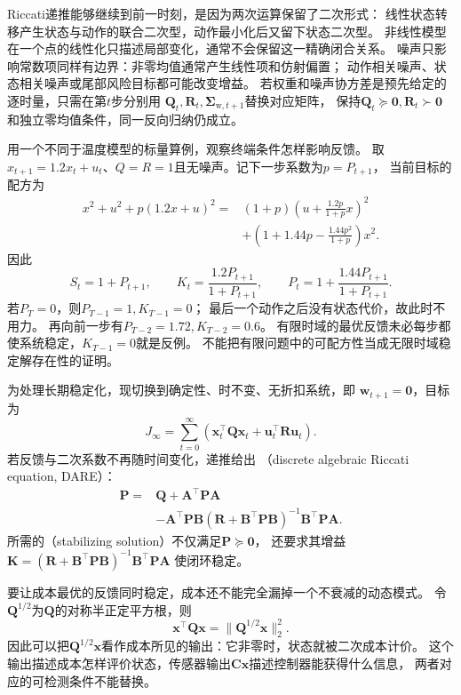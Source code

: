 Riccati递推能够继续到前一时刻，是因为两次运算保留了二次形式：
线性状态转移产生状态与动作的联合二次型，动作最小化后又留下状态二次型。
非线性模型在一个点的线性化只描述局部变化，通常不会保留这一精确闭合关系。
噪声只影响常数项同样有边界：非零均值通常产生线性项和仿射偏置；
动作相关噪声、状态相关噪声或尾部风险目标都可能改变增益。
若权重和噪声协方差是预先给定的逐时量，只需在第$t$步分别用
$\bm Q_t,\bm R_t,\bm\Sigma_{\mathrm w,t+1}$替换对应矩阵，
保持$\bm Q_t\succeq\bm0,\bm R_t\succ\bm0$和独立零均值条件，同一反向归纳仍成立。

用一个不同于温度模型的标量算例，观察终端条件怎样影响反馈。
取$x_{t+1}=1.2x_t+u_t$、$Q=R=1$且无噪声。记下一步系数为$p=P_{t+1}$，
当前目标的配方为
\[
  \begin{aligned}
  x^2+u^2+p(1.2x+u)^2
   ={}&(1+p)\left(u+\frac{1.2p}{1+p}x\right)^2\\
     &+\left(1+1.44p-\frac{1.44p^2}{1+p}\right)x^2.
  \end{aligned}
\]
因此
\[
  S_t=1+P_{t+1},\qquad
  K_t=\frac{1.2P_{t+1}}{1+P_{t+1}},
  \qquad
  P_t=1+\frac{1.44P_{t+1}}{1+P_{t+1}}.
\]
若$P_T=0$，则$P_{T-1}=1,K_{T-1}=0$；
最后一个动作之后没有状态代价，故此时不用力。
再向前一步有$P_{T-2}=1.72,K_{T-2}=0.6$。
有限时域的最优反馈未必每步都使系统稳定，$K_{T-1}=0$就是反例。
不能把有限问题中的可配方性当成无限时域稳定解存在性的证明。

为处理长期稳定化，现切换到确定性、时不变、无折扣系统，即
$\bm w_{t+1}=\bm0$，目标为
\[
  J_\infty=\sum_{t=0}^\infty
  (\bm x_t^\top\bm Q\bm x_t+\bm u_t^\top\bm R\bm u_t).
\]
若反馈与二次系数不再随时间变化，递推给出
（discrete algebraic Riccati equation, DARE）：
\begin{equation}
  \begin{aligned}
  \bm P={}&\bm Q+\bm A^\top\bm P\bm A\\
     &-\bm A^\top\bm P\bm B
       (\bm R+\bm B^\top\bm P\bm B)^{-1}\bm B^\top\bm P\bm A.
  \end{aligned}
  \label{eq:control-dare}
\end{equation}
所需的（stabilizing solution）不仅满足$\bm P\succeq\bm0$，
还要求其增益
$\bm K=(\bm R+\bm B^\top\bm P\bm B)^{-1}\bm B^\top\bm P\bm A$
使闭环稳定。

要让成本最优的反馈同时稳定，成本还不能完全漏掉一个不衰减的动态模式。
令$\bm Q^{1/2}$为$\bm Q$的对称半正定平方根，则
\[
  \bm x^\top\bm Q\bm x=\|\bm Q^{1/2}\bm x\|_2^2.
\]
因此可以把$\bm Q^{1/2}\bm x$看作成本所见的输出：它非零时，状态就被二次成本计价。
这个输出描述成本怎样评价状态，传感器输出$\bm C\bm x$描述控制器能获得什么信息，
两者对应的可检测条件不能替换。

